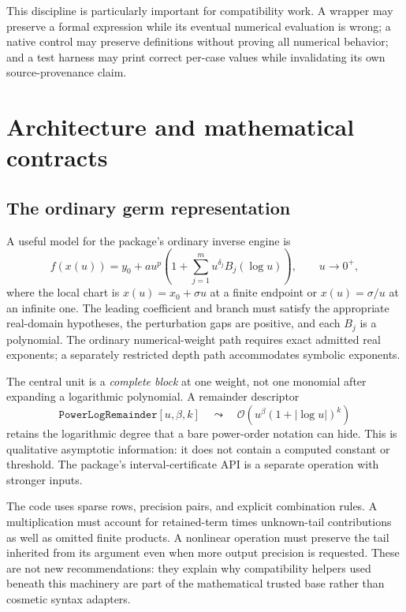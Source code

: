\documentclass[11pt,a4paper]{article}
\newcommand{\code}[1]{\texttt{#1}}
\newcommand{\OO}{\mathcal{O}}
\begin{document}
This discipline is particularly important for compatibility work. A wrapper may preserve a formal expression while its eventual numerical evaluation is wrong; a native control may preserve definitions without proving all numerical behavior; and a test harness may print correct per-case values while invalidating its own source-provenance claim.

\section{Architecture and mathematical contracts}
\subsection{The ordinary germ representation}
A useful model for the package's ordinary inverse engine is
\begin{equation}
 f(x(u))=y_0+a u^p\left(1+\sum_{j=1}^{m}u^{\delta_j}B_j(\log u)\right),
 \qquad u\to0^+,
 \label{eq:model}
\end{equation}
where the local chart is $x(u)=x_0+\sigma u$ at a finite endpoint or $x(u)=\sigma/u$ at an infinite one. The leading coefficient and branch must satisfy the appropriate real-domain hypotheses, the perturbation gaps are positive, and each $B_j$ is a polynomial. The ordinary numerical-weight path requires exact admitted real exponents; a separately restricted depth path accommodates symbolic exponents.\cite{coreentry,coreperturb}

The central unit is a \emph{complete block} at one weight, not one monomial after expanding a logarithmic polynomial. A remainder descriptor
\begin{equation}
 \code{PowerLogRemainder}[u,\beta,k]
 \quad\leadsto\quad
 \OO\!\left(u^\beta(1+|\log u|)^k\right)
 \label{eq:remainder}
\end{equation}
retains the logarithmic degree that a bare power-order notation can hide. This is qualitative asymptotic information: it does not contain a computed constant or threshold. The package's interval-certificate API is a separate operation with stronger inputs.\cite{coreentry}

The code uses sparse rows, precision pairs, and explicit combination rules. A multiplication must account for retained-term times unknown-tail contributions as well as omitted finite products. A nonlinear operation must preserve the tail inherited from its argument even when more output precision is requested. These are not new recommendations: they explain why compatibility helpers used beneath this machinery are part of the mathematical trusted base rather than cosmetic syntax adapters.
\end{document}
